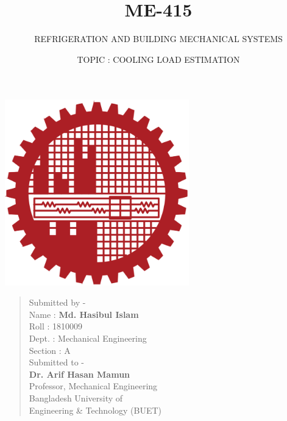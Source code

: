 \documentclass{article}
\title{ME-415}
\subtitle{REFRIGERATION AND BUILDING MECHANICAL SYSTEMS}
\author{TOPIC : COOLING LOAD ESTIMATION}
\begin{document}
\begin{titlepage}
    \centering
    
    {\Huge\bfseries\maketitle}
    \vspace{1cm}
    \includegraphics[width=8cm]{institution_logo.jpg}
    \vspace*{3cm}
    \begin{multicols}{2}
      \begin{quote}
        
        \begin{flushleft}
          
          \hspace{1cm} Submitted by - \\
          \hspace{1cm} Name : \textbf{Md. Hasibul Islam}\\
          \hspace{1cm} Roll : 1810009\\
          \hspace{1cm} Dept. : Mechanical Engineering\\ 
          \hspace{1cm} Section : A \\
          \hspace{1cm} Submitted to - \\
          \hspace{1cm} \textbf{Dr. Arif Hasan Mamun} \\ 
          \hspace{1cm} Professor, Mechanical Engineering \\ 
          \hspace{1cm} Bangladesh University of \\ \hspace{1cm} Engineering \& Technology (BUET)
        \end{flushleft}
      \end{quote}
      \end{multicols}
    \vfill
\end{titlepage}
\end{document}
